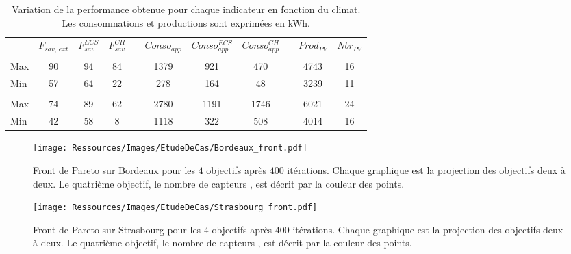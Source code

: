 \begin{table}
\centering
\caption[Performance maximale pouvant être obtenue pour différents indicateurs]
         {Variation de la performance obtenue pour chaque indicateur en fonction du climat.
          Les consommations et productions sont exprimées en \si{kWh}.}
\label{tab:bornes_front_pareto}
\begin{tabular}{L{2cm} c c c c c c c c c c}
    \toprule
                & $F_{sav,\,ext}$ & $F_{sav}^{ECS}$ & $F_{sav}^{CH}$ & & $Conso_{app}$ & $Conso_{app}^{ECS}$ & $Conso_{app}^{CH}$ & & $Prod_{PV}$ & $Nbr_{PV}$ \\
    \addlinespace
     \\
    \midrule
    Max & 90  & 94  & 84  &   & 1379  & 921 & 470 &   & 4743  & 16  \\
    Min & 57  & 64  & 22  &   & 278 & 164 & 48  &   & 3239  & 11  \\
    \addlinespace
     \\
    \midrule
    Max & 74  & 89  & 62  &   & 2780  & 1191  & 1746  &   & 6021  &  24 \\
    Min & 42  & 58  & 8 &   & 1118  & 322 & 508 &   & 4014  & 16  \\
    \bottomrule
\end{tabular}
\end{table}


\begin{figure}
    \centering
    \texttt{[image: Ressources/Images/EtudeDeCas/Bordeaux\_front.pdf]}
    \caption[Front de Pareto sur Bordeaux pour les $4$ objectifs après $400$ itérations]
             {Front de Pareto sur Bordeaux pour les $4$ objectifs après $400$ itérations.
              Chaque graphique est la projection des objectifs deux à deux.
              Le quatrième objectif, le nombre de capteurs , est décrit par la couleur des points.}
    \label{fig:front_pareto_bordeaux}
\end{figure}

\begin{figure}
    \centering
    \texttt{[image: Ressources/Images/EtudeDeCas/Strasbourg\_front.pdf]}
    \caption[Front de Pareto sur Strasbourg pour les $4$ objectifs après $400$ itérations]
             {Front de Pareto sur Strasbourg pour les $4$ objectifs après $400$ itérations.
              Chaque graphique est la projection des objectifs deux à deux.
              Le quatrième objectif, le nombre de capteurs , est décrit par la couleur des points.}
    \label{fig:front_pareto_strasbourg}
\end{figure}

